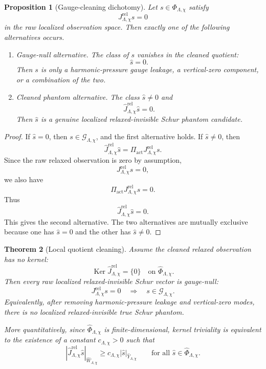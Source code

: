\documentclass[11pt]{article}
\numberwithin{equation}{section}
\newtheorem{theorem}{Theorem}[section]
\newtheorem{proposition}[theorem]{Proposition}
\DeclareMathOperator{\Ker}{Ker}
\begin{document}
\begin{proposition}[Gauge-cleaning dichotomy]\label{prop:gauge-cleaning-dichotomy}
Let \(s\in\Phi_{\Lambda,\chi}\) satisfy
\[
        J_{\Lambda,\chi}^{\mathrm{rel}}s=0
\]
in the raw localized observation space.  Then exactly one of the following alternatives occurs.
\begin{enumerate}[label=(\roman*)]
\item \emph{Gauge-null alternative.}  The class of \(s\) vanishes in the cleaned quotient:
\[
        \widehat s=0.
\]
Then \(s\) is only a harmonic-pressure gauge leakage, a vertical-zero component, or a combination of the two.

\item \emph{Cleaned phantom alternative.}  The class \(\widehat s\neq0\) and
\[
        \widehat J_{\Lambda,\chi}^{\mathrm{rel}}\widehat s=0.
\]
Then \(\widehat s\) is a genuine localized relaxed-invisible Schur phantom candidate.
\end{enumerate}
\end{proposition}

\begin{proof}
If \(\widehat s=0\), then \(s\in\mathcal G_{\Lambda,\chi}\), and the first alternative holds.  If \(\widehat s\neq0\), then
\[
        \widehat J_{\Lambda,\chi}^{\mathrm{rel}}\widehat s
        =\Pi_{\mathrm{act}}J_{\Lambda,\chi}^{\mathrm{rel}}s.
\]
Since the raw relaxed observation is zero by assumption,
\[
        J_{\Lambda,\chi}^{\mathrm{rel}}s=0,
\]
we also have
\[
        \Pi_{\mathrm{act}}J_{\Lambda,\chi}^{\mathrm{rel}}s=0.
\]
Thus
\[
        \widehat J_{\Lambda,\chi}^{\mathrm{rel}}\widehat s=0.
\]
This gives the second alternative.  The two alternatives are mutually exclusive because one has \(\widehat s=0\) and the other has \(\widehat s\neq0\).
\end{proof}

\begin{theorem}[Local quotient cleaning]\label{thm:local-quotient-cleaning}
Assume the cleaned relaxed observation has no kernel:
\[
        \Ker \widehat J_{\Lambda,\chi}^{\mathrm{rel}}
        =\{0\}
        \quad
        \text{on }
        \widehat\Phi_{\Lambda,\chi}.
\]
Then every raw localized relaxed-invisible Schur vector is gauge-null:
\[
        J_{\Lambda,\chi}^{\mathrm{rel}}s=0
        \quad\Longrightarrow\quad
        s\in\mathcal G_{\Lambda,\chi}.
\]
Equivalently, after removing harmonic-pressure leakage and vertical-zero modes, there is no localized relaxed-invisible true Schur phantom.

More quantitatively, since \(\widehat\Phi_{\Lambda,\chi}\) is finite-dimensional, kernel triviality is equivalent to the existence of a constant \(c_{\Lambda,\chi}>0\) such that
\[
        |\widehat J_{\Lambda,\chi}^{\mathrm{rel}}\widehat s|_{\widehat W_{\Lambda,\chi}}
        \ge
        c_{\Lambda,\chi}
        |\widehat s|_{\widehat Y_{\Lambda,\chi}}
        \qquad
        \text{for all }
        \widehat s\in\widehat\Phi_{\Lambda,\chi}.
\]
\end{theorem}
\end{document}
